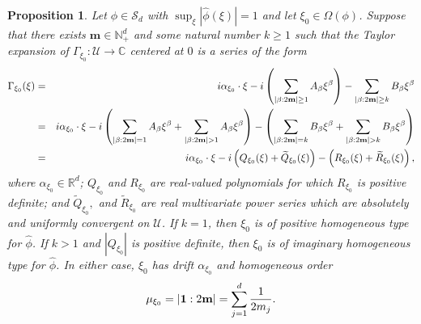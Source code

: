\documentclass[11pt]{article}
\newtheorem{proposition}[theorem]{Proposition}
\theoremstyle{remark}
\newcommand{\lp}{\left(}
\newcommand{\rp}{\right)}
\newcommand{\al}{\alpha}
\newcommand{\be}{\beta}
\begin{document}
\begin{proposition}\label{prop:ExpandGamma}
Let $\phi\in\mathcal{S}_d$ with $\sup_{\xi}|\widehat{\phi}(\xi)|=1$ and let $\xi_0\in\Omega(\phi)$. Suppose that there exists $\mathbf{m}\in \mathbb{N}^d_+$ and some natural number $k \geq 1$ such that the Taylor expansion of $\Gamma_{\xi_0} : \mathcal{U}\to\mathbb{C}$ centered at $0$ is a series of the form
\begin{eqnarray}\label{eq:SemiEllipticImaginaryExpansion}\nonumber
    \Gamma_{\xi_0}(\xi) 
    &=& i\al_{\xi_0} \cdot \xi - i \left( \sum_{\abs{\be : 2\mathbf{m}} \geq 1} A_\be \xi^\be\right) - \sum_{\abs{\be : 2\mathbf{m}} \geq k} B_\be \xi^\be \\ \nonumber
    &=& i\al_{\xi_0} \cdot \xi - i \lp \sum_{\abs{\be : 2\mathbf{m}} = 1} A_\be \xi^\be + \sum_{\abs{\be : 2\mathbf{m}} > 1} A_\be \xi^\be\rp 
    - \lp \sum_{\abs{\be : 2\mathbf{m}} = k} B_\be \xi^\be + \sum_{\abs{\be : 2\mathbf{m}} > k} B_\be \xi^\be \rp \\
    &=&  i\al_{\xi_0} \cdot \xi - i\lp Q_{\xi_0}(\xi) + \widetilde{Q}_{\xi_0}(\xi)\rp - \lp R_{\xi_0}(\xi) + \widetilde{R}_{\xi_0}(\xi) \rp,
\end{eqnarray}
where $\al_{\xi_0} \in \mathbb{R}^d$;   $Q_{\xi_0}$ and $R_{\xi_0}$ are real-valued polynomials for which $R_{\xi_0}$ is positive definite; and  $\widetilde{Q}_{\xi_0},$ and $\widetilde{R}_{\xi_0}$ are real multivariate power series which are absolutely and uniformly convergent on $\mathcal{U}$. If $k=1$, then $\xi_0$ is of positive homogeneous type for $\widehat{\phi}$. If $k>1$ and $|Q_{\xi_0}|$ is positive definite, then $\xi_0$ is of imaginary homogeneous type for $\hat{\phi}$. In either case, $\xi_0$ has drift $\alpha_{\xi_0}$ and homogeneous order
\begin{equation*}
    \mu_{\xi_0}=\abs{\mathbf{1}:2\mathbf{m}}=\sum_{j=1}^d\frac{1}{2m_j}.
\end{equation*}
\end{proposition}
\end{document}
